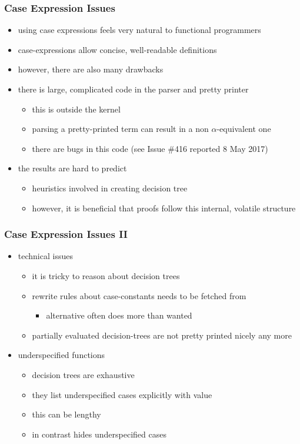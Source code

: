\begin{frame}[fragile]
\frametitle{Case Expression Issues}

\begin{itemize}
\item using case expressions feels very natural to functional programmers
\item case-expressions allow concise, well-readable definitions
\item however, there are also many drawbacks
\item there is large, complicated code in the parser and pretty printer
\begin{itemize}
\item this is outside the kernel
\item parsing a pretty-printed term can result in a non $\alpha$-equivalent one
\item there are bugs in this code (see \eg Issue \#416 reported 8 May 2017)
\end{itemize}
\item the results are hard to predict
\begin{itemize}
\item heuristics involved in creating decision tree
\item however, it is beneficial that proofs follow this internal, volatile structure
\end{itemize} 
\end{itemize}
\end{frame}


\begin{frame}[fragile]
\frametitle{Case Expression Issues II}

\begin{itemize}
\item technical issues
\begin{itemize}
\item it is tricky to reason about decision trees
\item rewrite rules about case-constants needs to be fetched from 
\begin{itemize}
\item alternative  often does more than wanted
\end{itemize}
\item partially evaluated decision-trees are not pretty printed nicely any more
\end{itemize}
\item underspecified functions
\begin{itemize}
\item decision trees are exhaustive
\item they list underspecified cases explicitly with value 
\item this can be lengthy
\item {} in contrast hides underspecified cases
\end{itemize}
\end{itemize}

\end{frame}


